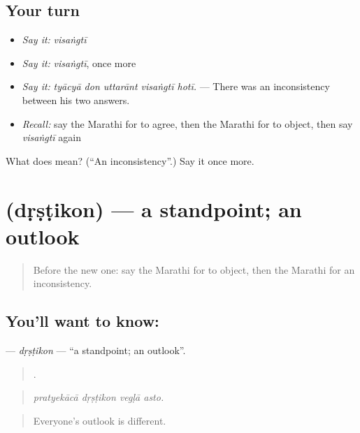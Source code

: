 \subsection*{Your turn}
\begin{itemize}
\raggedright
  \item \emph{Say it:} \emph{visaṅgtī}
  \item \emph{Say it:} \emph{visaṅgtī}, once more
  \item \emph{Say it:} \emph{tyācyā don uttarānt visaṅgtī hotī.} — There was an inconsistency between his two answers.
  \item \emph{Recall:} say the Marathi for to agree, then the Marathi for to object, then say \emph{visaṅgtī} again
\end{itemize}

\begin{tcolorbox}[breakable,colback=teal!4,colframe=teal!35!black,title={Before you move on}]
What does  mean? (\textquotedblleft{}An inconsistency\textquotedblright{}.) Say it once more.
\end{tcolorbox}
\section[\texorpdfstring{\mr{दृष्टिकोन} (dṛṣṭikon)}{दृष्टिकोन (dṛṣṭikon)}]{ (dṛṣṭikon) — a standpoint; an outlook}

\label{lesson:MR-C344-drstikon}



\begin{quote}
Before the new one: say the Marathi for to object, then the Marathi for an inconsistency.
\end{quote}

\subsection*{You'll want to know: }
\textbf{} — \emph{dṛṣṭikon} — \textquotedblleft{}a standpoint; an outlook\textquotedblright{}.

\begin{quote}
   .
\end{quote}

\begin{quote}
\emph{pratyekācā dṛṣṭikon vegḷā asto.}
\end{quote}

\begin{quote}
Everyone's outlook is different.
\end{quote}


